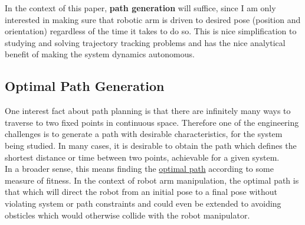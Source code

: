 \documentclass[journal]{IEEEtran}
\begin{document}
In the context of this paper, \textbf{path generation} will suffice, since I am only interested in making sure that robotic arm is driven to desired pose (position and orientation) regardless of the time it takes to do so. This is nice simplification to studying and solving trajectory tracking problems and has the nice analytical benefit of making the system dynamics autonomous.

\subsection{Optimal Path Generation}

One interest fact about path planning is that there are infinitely many ways to traverse to two fixed points in continuous space. Therefore one of the engineering challenges is to generate a path with desirable characteristics, for the system being studied. In many cases, it is desirable to obtain the path which defines the shortest distance or time between two points, achievable for a given system. \\

In a broader sense, this means finding the \underline{optimal path} according to some measure of fitness. In the context of robot arm manipulation, the optimal path is that which will direct the robot from an initial pose to a final pose without violating system or path constraints and could even be extended to avoiding obsticles which would otherwise collide with the robot manipulator. \\
\end{document}
